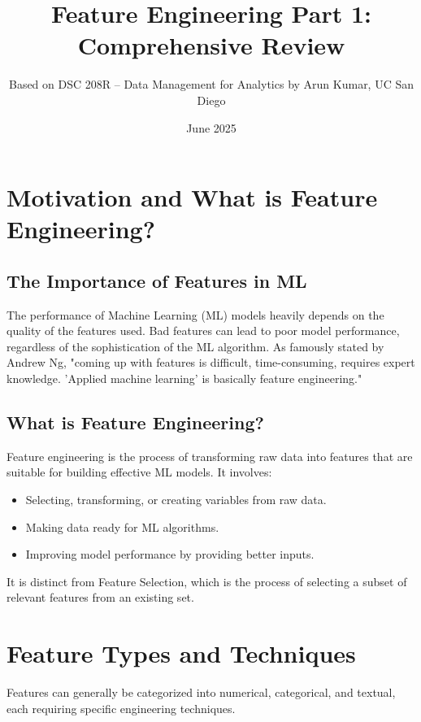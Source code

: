 \documentclass{article}
\title{Feature Engineering Part 1: Comprehensive Review}
\author{Based on DSC 208R – Data Management for Analytics by Arun Kumar, UC San Diego}
\date{June 2025}
\begin{document}
\maketitle

\section*{Motivation and What is Feature Engineering?}

\subsection*{The Importance of Features in ML}
The performance of Machine Learning (ML) models heavily depends on the quality of the features used. Bad features can lead to poor model performance, regardless of the sophistication of the ML algorithm. As famously stated by Andrew Ng, "coming up with features is difficult, time-consuming, requires expert knowledge. 'Applied machine learning' is basically feature engineering."

\subsection*{What is Feature Engineering?}
Feature engineering is the process of transforming raw data into features that are suitable for building effective ML models. It involves:
\begin{itemize}
    \item Selecting, transforming, or creating variables from raw data.
    \item Making data ready for ML algorithms.
    \item Improving model performance by providing better inputs.
\end{itemize}
It is distinct from Feature Selection, which is the process of selecting a subset of relevant features from an existing set.

\section*{Feature Types and Techniques}
Features can generally be categorized into numerical, categorical, and textual, each requiring specific engineering techniques.
\end{document}
